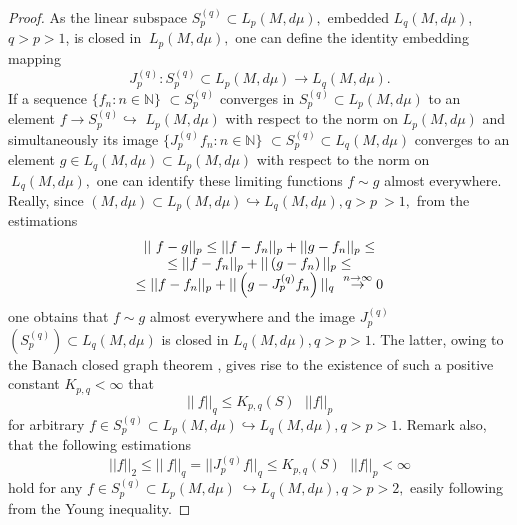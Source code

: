 \documentclass[pdflatex,sn-mathphys-num]{sn-jnl}%
\theoremstyle{thmstyleone}%
\theoremstyle{thmstyletwo}%
\theoremstyle{thmstylethree}%
\begin{document}
\begin{proof}
	As the linear subspace $S_{p}^{(q)}\subset L_{p}(M,d\mu ),$ embedded $%
	L_{q}(M,d\mu )$, $q>p>1$, is closed in $\ L_{p}(M,d\mu ),$ one can define
	the identity embedding mapping 
	\begin{equation}
		J_{p}^{(q)}:S_{p}^{(q)}\subset L_{p}(M,d\mu )\rightarrow L_{q}(M,d\mu ).
		\label{1a}
	\end{equation}%
	If a sequence $\{f_{n}:n\in \mathbb{N}\}$ $\subset S_{p}^{(q)}$ converges in 
	$S_{p}^{(q)}\subset L_{p}(M,d\mu )$ to an element 
	$f\rightarrow S_{p}^{(q)}\hookrightarrow $ $L_{p}(M,d\mu )$ with respect to the norm on 
	$L_{p}(M,d\mu )$ and simultaneously its image $\{J_{p}^{(q)}f_{n}:n\in 
	\mathbb{N}\}$ $\subset S_{p}^{(q)}\subset L_{q}(M,d\mu )$ converges to an
	element $g\in L_{q}(M,d\mu )\subset L_{p}(M,d\mu )$ with respect to the norm
	on$\ L_{q}(M,d\mu ),$ one can identify these limiting functions $f\sim g$ 
	almost everywhere. Really, since $(M,d\mu )\subset L_{p}(M,d\mu
	)\hookrightarrow L_{q}(M,d\mu ),q>p\ >1,$ from the estimations 
	\begin{equation}
		\begin{array}{c}
			||\ f-g||_{p}\leq ||f-f_{n}||_{p}+||g-f_{n}||_{p}\leq \\ 
			\leq ||f-f_{n}||_{p}+||\left( g-f_{n}\right) ||_{p}\leq \\ 
			\leq ||f-f_{n}||_{p}+||\left( g-J_{p}^{(q)}f_{n}\right) ||_{q}\ \overset{%
				n\rightarrow \infty }{\rightarrow }0%
		\end{array}
		\label{1b}
	\end{equation}%
	one obtains that $f\sim g$ almost everywhere and the image $J_{p}^{(q)}$ $%
	(S_{p}^{(q)})\subset L_{q}(M,d\mu )$ is closed in $L_{q}(M,d\mu ),q>p>1.$
	The latter, owing to the Banach closed graph theorem \cite%
	{Bana,BaLyMy,Lax,ReSi,Rudi}, gives rise to the existence of such a positive
	constant $K_{p,q}<\infty $ that 
	\begin{equation}
		||\ f||_{q}\leq K_{p,q}(S)\text{ }||f||_{p}  \label{2}
	\end{equation}%
	for arbitrary $f\in S_{p}^{(q)}\subset L_{p}(M,d\mu )\hookrightarrow
	L_{q}(M,d\mu ),q>p>1$. Remark also, that the following estimations 
	\begin{equation}
		||f||_{2}\leq ||\ f||_{q}=||J_{p}^{(q)}f||_{q}\leq K_{p,q}(S)\text{ }%
		||f||_{p}<\infty  \label{3}
	\end{equation}%
	hold for any $f\in S_{p}^{(q)}\subset L_{p}(M,d\mu )\ \hookrightarrow
	L_{q}(M,d\mu ),q>p>2,$ easily following from the Young inequality. %
\end{proof}
\end{document}

